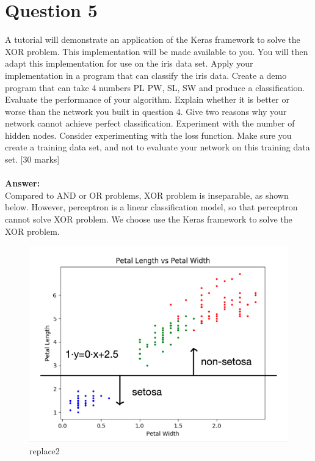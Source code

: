 \documentclass{article}
\begin{document}
\section{Question 5}
A tutorial will demonstrate an application of the Keras framework to solve the XOR problem. This implementation will be made available to you. You will then adapt this implementation for use on the iris data set.
Apply your implementation in a program that can classify the iris data. Create a demo program that can take 4 numbers PL PW, SL, SW and produce a classification. Evaluate the performance of your algorithm. Explain whether it is better or worse than the network you built in question 4. Give two reasons why your network cannot achieve perfect classification.
Experiment with the number of hidden nodes. Consider experimenting with the loss function. Make sure you create a training data set, and not to evaluate your network on this training data set.
[30 marks]\\\\
\textbf{Answer:}\\
Compared to AND or OR problems, XOR problem is inseparable, as shown below. However, perceptron is a linear classification model, so that perceptron cannot solve XOR problem. We choose use the Keras framework to solve the XOR problem.
\begin{figure}[H]
\centering
\includegraphics[scale=0.4]{PLvsPW.png}
\caption{replace2}
\end{figure}
\noindent
\end{document}
